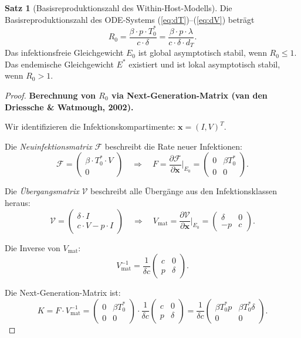﻿\documentclass[a4paper,12pt]{article}
\theoremstyle{definition}
\newtheorem{satz}{Satz}
\begin{document}
\begin{satz}[Basisreproduktionszahl des Within-Host-Modells]
\label{satz:R0}
Die Basisreproduktionszahl des ODE-Systems (\ref{eq:dT})--(\ref{eq:dV}) betr\"agt
\[
\boxed{R_0 = \frac{\beta \cdot p \cdot T_0^*}{c \cdot \delta}
           = \frac{\beta \cdot p \cdot \lambda}{c \cdot \delta \cdot d_T}.}
\]
Das infektionsfreie Gleichgewicht $E_0$ ist global asymptotisch stabil, wenn $R_0 \leq 1$.
Das endemische Gleichgewicht $E^*$ existiert und ist lokal asymptotisch stabil, wenn $R_0 > 1$.
\end{satz}

\begin{proof}
\textbf{Berechnung von $R_0$ via Next-Generation-Matrix (van den Driessche \& Watmough, 2002).}

Wir identifizieren die Infektionskompartimente: $\mathbf{x} = (I, V)^T$.

Die \emph{Neuinfektionsmatrix} $\mathcal{F}$ beschreibt die Rate neuer Infektionen:
\[
\mathcal{F} = \begin{pmatrix} \beta \cdot T_0^* \cdot V \\ 0 \end{pmatrix}
\quad\Rightarrow\quad
F = \frac{\partial \mathcal{F}}{\partial \mathbf{x}}\Bigg|_{E_0}
= \begin{pmatrix} 0 & \beta T_0^* \\ 0 & 0 \end{pmatrix}.
\]

Die \emph{\"Ubergangsmatrix} $\mathcal{V}$ beschreibt alle \"Uberg\"ange aus den
Infektionsklassen heraus:
\[
\mathcal{V} = \begin{pmatrix} \delta \cdot I \\ c \cdot V - p \cdot I \end{pmatrix}
\quad\Rightarrow\quad
V_{\text{mat}} = \frac{\partial \mathcal{V}}{\partial \mathbf{x}}\Bigg|_{E_0}
= \begin{pmatrix} \delta & 0 \\ -p & c \end{pmatrix}.
\]

Die Inverse von $V_{\text{mat}}$:
\[
V_{\text{mat}}^{-1} = \frac{1}{\delta c}
\begin{pmatrix} c & 0 \\ p & \delta \end{pmatrix}.
\]

Die Next-Generation-Matrix ist:
\[
K = F \cdot V_{\text{mat}}^{-1}
= \begin{pmatrix} 0 & \beta T_0^* \\ 0 & 0 \end{pmatrix}
\cdot \frac{1}{\delta c} \begin{pmatrix} c & 0 \\ p & \delta \end{pmatrix}
= \frac{1}{\delta c} \begin{pmatrix} \beta T_0^* p & \beta T_0^* \delta \\ 0 & 0 \end{pmatrix}.
\]


\end{proof}
\end{document}
